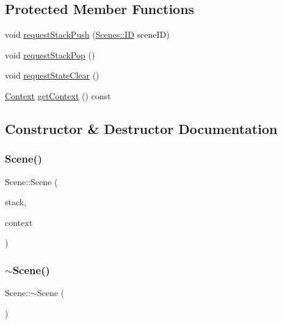 \subsection*{Protected Member Functions}
\begin{DoxyCompactItemize}
\item 
void \hyperlink{class_scene_a38d36125a421eab649188edb740d1c36}{request\+Stack\+Push} (\hyperlink{namespace_scenes_a0ad7ab6856b1d77d498e3a251f6bb275}{Scenes\+::\+ID} scene\+ID)
\item 
void \hyperlink{class_scene_ad2f2093a8adc09c11e89cda6f94a3dd1}{request\+Stack\+Pop} ()
\item 
void \hyperlink{class_scene_a0cc91a92f27ba281b52c58168b7a000a}{request\+State\+Clear} ()
\item 
\hyperlink{struct_scene_1_1_context}{Context} \hyperlink{class_scene_acab4ecf24b21ffa8e423a8e4fd45c491}{get\+Context} () const
\end{DoxyCompactItemize}


\subsection{Constructor \& Destructor Documentation}
\hypertarget{class_scene_a9834819a1140a2c066024927e6dc9692}{}\label{class_scene_a9834819a1140a2c066024927e6dc9692} 
\subsubsection{\texorpdfstring{Scene()}{Scene()}}
{\footnotesize\ttfamily Scene\+::\+Scene (\begin{DoxyParamCaption}\item[{\hyperlink{class_scene_stack}{Scene\+Stack} \&}]{stack,  }\item[{\hyperlink{struct_scene_1_1_context}{Context}}]{context }\end{DoxyParamCaption})}

\hypertarget{class_scene_a3b8cec2e32546713915f8c6303c951f1}{}\label{class_scene_a3b8cec2e32546713915f8c6303c951f1} 
\subsubsection{\texorpdfstring{$\sim$\+Scene()}{~Scene()}}
{\footnotesize\ttfamily Scene\+::$\sim$\+Scene (\begin{DoxyParamCaption}{ }\end{DoxyParamCaption})\hspace{0.3cm}{\ttfamily [virtual]}}



